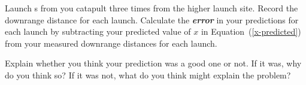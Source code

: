 Launch \mymm{}s from you catapult three times from the higher launch site. 
Record the downrange distance for each launch.
Calculate the {\bfseries\itshape error} in your predictions 
for each launch
by subtracting your predicted value of $x$ in Equation~(\ref{x-predicted}) 
from your measured downrange distances for each launch.

Explain whether you think your prediction was a good one or not. 
If it was, why do you think so?
If it was not, what do you think might explain the problem?

\myCenteredBox[colback=\myFillinColor]{
    \vspace{1em}
    \underline{\hspace{\textwidth}}\\[0.5\baselineskip]
    \underline{\hspace{\textwidth}}\\[0.5\baselineskip]
    \underline{\hspace{\textwidth}}\\[0.5\baselineskip]
    \underline{\hspace{\textwidth}}\\[0.5\baselineskip]
    \underline{\hspace{\textwidth}}\\[0.5\baselineskip]
    \underline{\hspace{\textwidth}}\\[0.5\baselineskip]
    \underline{\hspace{\textwidth}}\\
}